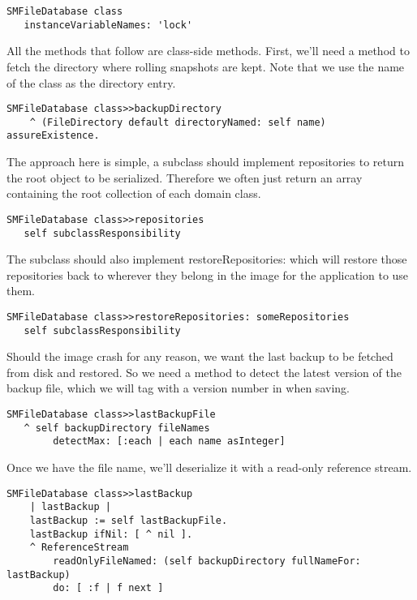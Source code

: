 \documentclass[a4paper,10pt,twoside]{book}
\newcommand{\ct}[1]{{\small\ttfamily\textup{#1}}}
\begin{document}
\begin{lstlisting}
SMFileDatabase class
   instanceVariableNames: 'lock'
\end{lstlisting}

All the methods that follow are class-side methods. First, we'll need a method to fetch the directory where rolling snapshots are kept. Note that we use the name of the class as the directory entry.

\begin{lstlisting}
SMFileDatabase class>>backupDirectory
    ^ (FileDirectory default directoryNamed: self name) assureExistence.
\end{lstlisting}

The approach here is simple, a subclass should implement \ct{repositories} to return the root object to be  serialized. Therefore we often just return an array containing the root collection of each domain class.

\begin{lstlisting}
SMFileDatabase class>>repositories
   self subclassResponsibility
\end{lstlisting}

The subclass should also implement \ct{restoreRepositories:} which will restore those repositories back to wherever they belong in the image for the application to use them.

\begin{lstlisting}
SMFileDatabase class>>restoreRepositories: someRepositories
   self subclassResponsibility
\end{lstlisting}

Should the image crash for any reason, we want the last backup to be fetched from disk and restored. So we need a method to detect the latest version of the backup file, which we will tag with a version number in when saving.

\begin{lstlisting}
SMFileDatabase class>>lastBackupFile
   ^ self backupDirectory fileNames
        detectMax: [:each | each name asInteger]
\end{lstlisting}

Once we have the file name, we'll deserialize it with a read-only reference stream.

\begin{lstlisting}
SMFileDatabase class>>lastBackup
    | lastBackup |
    lastBackup := self lastBackupFile.
    lastBackup ifNil: [ ^ nil ].
    ^ ReferenceStream
        readOnlyFileNamed: (self backupDirectory fullNameFor: lastBackup)
        do: [ :f | f next ]
\end{lstlisting}
\end{document}
